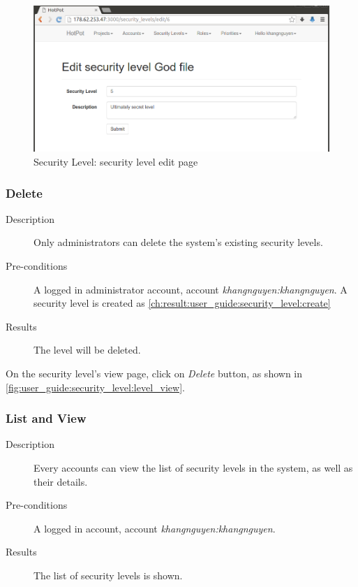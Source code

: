 \begin{figure}[bth]
\myfloatalign
\includegraphics[width=1.0\linewidth]{gfx/chapter_5/security_level/level_edit}
\caption[Security Level: security level edit page]{Security Level: security level edit page}
\label{fig:user_guide:security_level:level_edit}
\end{figure}

\subsubsection{Delete}
\label{ch:result:user_guide:security_level:delete}

\begin{description}
\item[Description] Only administrators can delete the system's existing security levels.
\item[Pre-conditions] A logged in administrator account, \eg account \emph{khangnguyen:khangnguyen}.
A security level is created as \autoref{ch:result:user_guide:security_level:create}
\item[Results] The level will be deleted.
\end{description}

On the security level's view page, click on \emph{Delete} button, as shown in \autoref{fig:user_guide:security_level:level_view}.

\subsubsection{List and View}
\label{ch:result:user_guide:security_level:list}

\begin{description}
\item[Description] Every accounts can view the list of security levels in the system, as well as their details.
\item[Pre-conditions] A logged in account, \eg account \emph{khangnguyen:khangnguyen}.
\item[Results] The list of security levels is shown.
\end{description}

